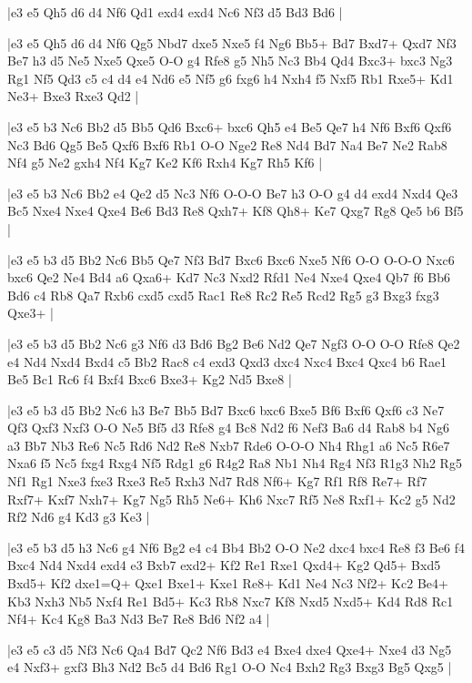 \whitename{}
\blackname{}
\makegametitle
|e3 e5 Qh5 d6 d4 Nf6 Qd1 exd4 exd4 Nc6 Nf3 d5 Bd3 Bd6  |

\whitename{}
\blackname{}
\makegametitle
|e3 e5 Qh5 d6 d4 Nf6 Qg5 Nbd7 dxe5 Nxe5 f4 Ng6 Bb5+ Bd7 Bxd7+ Qxd7 Nf3 Be7 h3 d5 Ne5 Nxe5 Qxe5 O-O g4 Rfe8 g5 Nh5 Nc3 Bb4 Qd4 Bxc3+ bxc3 Ng3 Rg1 Nf5 Qd3 c5 c4 d4 e4 Nd6 e5 Nf5 g6 fxg6 h4 Nxh4 f5 Nxf5 Rb1 Rxe5+ Kd1 Ne3+ Bxe3 Rxe3 Qd2  |

\whitename{}
\blackname{}
\makegametitle
|e3 e5 b3 Nc6 Bb2 d5 Bb5 Qd6 Bxc6+ bxc6 Qh5 e4 Be5 Qe7 h4 Nf6 Bxf6 Qxf6 Nc3 Bd6 Qg5 Be5 Qxf6 Bxf6 Rb1 O-O Nge2 Re8 Nd4 Bd7 Na4 Be7 Ne2 Rab8 Nf4 g5 Ne2 gxh4 Nf4 Kg7 Ke2 Kf6 Rxh4 Kg7 Rh5 Kf6  |

\whitename{}
\blackname{}
\makegametitle
|e3 e5 b3 Nc6 Bb2 e4 Qe2 d5 Nc3 Nf6 O-O-O Be7 h3 O-O g4 d4 exd4 Nxd4 Qe3 Bc5 Nxe4 Nxe4 Qxe4 Be6 Bd3 Re8 Qxh7+ Kf8 Qh8+ Ke7 Qxg7 Rg8 Qe5 b6 Bf5  |

\whitename{}
\blackname{}
\makegametitle
|e3 e5 b3 d5 Bb2 Nc6 Bb5 Qe7 Nf3 Bd7 Bxc6 Bxc6 Nxe5 Nf6 O-O O-O-O Nxc6 bxc6 Qe2 Ne4 Bd4 a6 Qxa6+ Kd7 Nc3 Nxd2 Rfd1 Ne4 Nxe4 Qxe4 Qb7 f6 Bb6 Bd6 c4 Rb8 Qa7 Rxb6 cxd5 cxd5 Rac1 Re8 Rc2 Re5 Rcd2 Rg5 g3 Bxg3 fxg3 Qxe3+  |

\whitename{}
\blackname{}
\makegametitle
|e3 e5 b3 d5 Bb2 Nc6 g3 Nf6 d3 Bd6 Bg2 Be6 Nd2 Qe7 Ngf3 O-O O-O Rfe8 Qe2 e4 Nd4 Nxd4 Bxd4 c5 Bb2 Rac8 c4 exd3 Qxd3 dxc4 Nxc4 Bxc4 Qxc4 b6 Rae1 Be5 Bc1 Rc6 f4 Bxf4 Bxc6 Bxe3+ Kg2 Nd5 Bxe8  |

\whitename{}
\blackname{}
\makegametitle
|e3 e5 b3 d5 Bb2 Nc6 h3 Be7 Bb5 Bd7 Bxc6 bxc6 Bxe5 Bf6 Bxf6 Qxf6 c3 Ne7 Qf3 Qxf3 Nxf3 O-O Ne5 Bf5 d3 Rfe8 g4 Bc8 Nd2 f6 Nef3 Ba6 d4 Rab8 b4 Ng6 a3 Bb7 Nb3 Re6 Nc5 Rd6 Nd2 Re8 Nxb7 Rde6 O-O-O Nh4 Rhg1 a6 Nc5 R6e7 Nxa6 f5 Nc5 fxg4 Rxg4 Nf5 Rdg1 g6 R4g2 Ra8 Nb1 Nh4 Rg4 Nf3 R1g3 Nh2 Rg5 Nf1 Rg1 Nxe3 fxe3 Rxe3 Re5 Rxh3 Nd7 Rd8 Nf6+ Kg7 Rf1 Rf8 Re7+ Rf7 Rxf7+ Kxf7 Nxh7+ Kg7 Ng5 Rh5 Ne6+ Kh6 Nxc7 Rf5 Ne8 Rxf1+ Kc2 g5 Nd2 Rf2 Nd6 g4 Kd3 g3 Ke3  |

\whitename{}
\blackname{}
\makegametitle
|e3 e5 b3 d5 h3 Nc6 g4 Nf6 Bg2 e4 c4 Bb4 Bb2 O-O Ne2 dxc4 bxc4 Re8 f3 Be6 f4 Bxc4 Nd4 Nxd4 exd4 e3 Bxb7 exd2+ Kf2 Re1 Rxe1 Qxd4+ Kg2 Qd5+ Bxd5 Bxd5+ Kf2 dxe1=Q+ Qxe1 Bxe1+ Kxe1 Re8+ Kd1 Ne4 Nc3 Nf2+ Kc2 Be4+ Kb3 Nxh3 Nb5 Nxf4 Re1 Bd5+ Kc3 Rb8 Nxc7 Kf8 Nxd5 Nxd5+ Kd4 Rd8 Rc1 Nf4+ Kc4 Kg8 Ba3 Nd3 Be7 Re8 Bd6 Nf2 a4  |

\whitename{}
\blackname{}
\makegametitle
|e3 e5 c3 d5 Nf3 Nc6 Qa4 Bd7 Qc2 Nf6 Bd3 e4 Bxe4 dxe4 Qxe4+ Nxe4 d3 Ng5 e4 Nxf3+ gxf3 Bh3 Nd2 Bc5 d4 Bd6 Rg1 O-O Nc4 Bxh2 Rg3 Bxg3 Bg5 Qxg5  |

